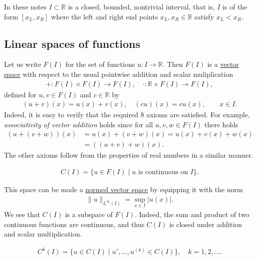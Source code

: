 \documentclass[12pt,oneside]{amsart}
\def\R{\mathbb R}
\begin{document}
In these notes $I \subset \R$ is a closed, bounded, nontrivial interval, that is, $I$ is of the form $[x_L, x_R]$
where the left and right end points $x_L, x_R \in \R$ satisfy $x_L < x_R$. 

\subsection{Linear spaces of functions}

Let us write $F(I)$ for the set of functions $u : I \to \mathbb R$. Then $F(I)$ is a 
\href{https://en.wikipedia.org/wiki/Vector_space#Notation_and_definition}{vector space} with respect to the usual pointwise addition and scalar muliplication
    \begin{align*}
+ : F(I) \times F(I) \to F(I), \quad \cdot : \mathbb R \times F(I) \to F(I),
    \end{align*}
defined for $u,v \in F(I)$ and $c \in \mathbb R$ by
    \begin{align*}
(u + v)(x) = u(x) + v(x), \quad (cu)(x) = cu(x), \qquad x \in I.
    \end{align*}
Indeed, it is easy to verify that the required 8 axioms are satisfied. For example, {\em associativity of vector addition} holds since for all $u,v,w \in F(I)$ there holds
    \begin{align*}
(u + (v + w))(x) 
&= 
u(x) + (v+w)(x) 
= 
u(x) + v(x) + w(x) 
\\&= 
((u + v) + w)(x).
    \end{align*}
The other axioms follow from the properties of real numbers in a similar manner.

\begin{definition}
    \begin{align*}
C(I) = \{ u \in F(I) \mid \text{$u$ is continuous on $I$}\}.
    \end{align*}
\end{definition}

This space can be made a \href{https://en.wikipedia.org/wiki/Normed_vector_space}{normed vector space} by equipping it with the norm 
    \begin{align*}
\|u\|_{L^\infty(I)} = \sup_{x \in I} |u(x)|.
    \end{align*}
We see that $C(I)$ is a subspace of $F(I)$. Indeed, the sum and product of two continuous functions are continuous, and thus $C(I)$ is closed under addition and scalar multiplication. 

\begin{definition}
    \begin{align*}
C^k(I) = \{ u \in C(I) \mid u', \dots, u^{(k)} \in C(I)\}, \quad k = 1,2,\dots.
    \end{align*}
\end{definition}
\end{document}
